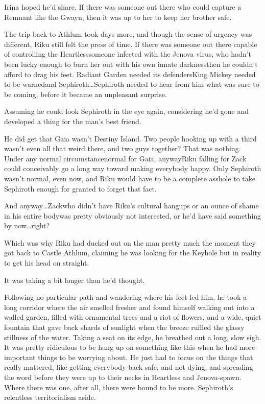 Irina hoped he'd share. If there was someone out there who could capture a Remnant like the Gwayn, then it was up to her to keep her brother safe.


\scenechange


The trip back to Athlum took days more, and though the sense of urgency was different, Riku still felt the press of time. If there was someone out there capable of controlling the Heartless\textemdash someone infected with the Jenova virus, who hadn't been lucky enough to burn her out with his own innate darkness\textemdash then he couldn't afford to drag his feet. Radiant Garden needed its defenders\textemdash King Mickey needed to be warned\textemdash and Sephiroth\ldots Sephiroth needed to hear from him what was sure to be coming, before it became an unpleasant surprise.

Assuming he could look Sephiroth in the eye again, considering he'd gone and developed a thing for the man's best friend.

He did get that Gaia wasn't Destiny Island. Two people hooking up with a third wasn't even all that weird there, and two guys together? That was nothing. Under any normal circumstance\textemdash normal for Gaia, anyway\textemdash Riku falling for Zack could conceivably go a long way toward making everybody happy. Only Sephiroth wasn't normal, even now, and Riku would have to be a complete asshole to take Sephiroth enough for granted to forget that fact.

And anyway\ldots Zack\textemdash who didn't have Riku's cultural hangups or an ounce of shame in his entire body\textemdash was pretty obviously not interested, or he'd have said something by now\ldots right?

Which was why Riku had ducked out on the man pretty much the moment they got back to Castle Athlum, claiming he was looking for the Keyhole but in reality to get his head on straight.

It was taking a bit longer than he'd thought.

Following no particular path and wandering where his feet led him, he took a long corridor where the air smelled fresher and found himself walking out into a walled garden, filled with ornamental trees and a riot of flowers, and a wide, quiet fountain that gave back shards of sunlight when the breeze ruffled the glassy stillness of the water. Taking a seat on its edge, he breathed out a long, slow sigh. It was pretty ridiculous to be hung up on something like this when he had more important things to be worrying about. He just had to focus on the things that really mattered, like getting everybody back safe, and not dying, and spreading the word before they were up to their necks in Heartless and Jenova-spawn. Where there was one, after all, there were bound to be more. Sephiroth's relentless territorialism aside.

